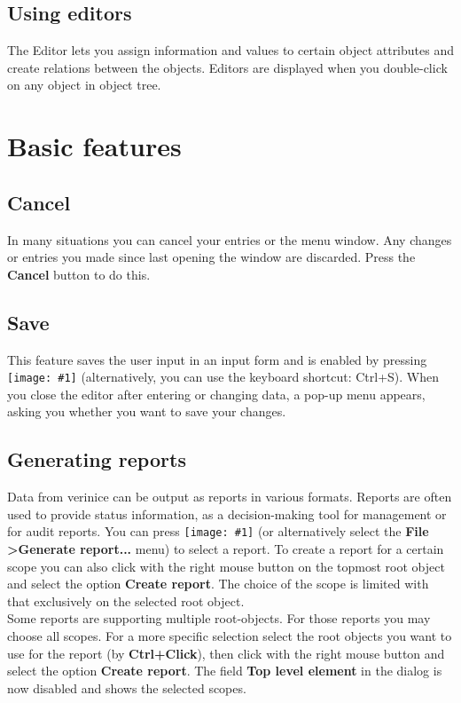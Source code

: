 \documentclass[a4paper,10pt]{book}
\newcommand{\icon}[1]{\texttt{[image: \#1]}}
\begin{document}
\section{Using editors}

The Editor lets you assign information and values to certain object attributes and create relations between the objects.
Editors are displayed when you double-click on any object in object tree.


\chapter{Basic features}
\section{Cancel}
In many situations you can cancel your entries or the menu window. Any changes or entries you made since last opening
the window are discarded. Press the \textbf{Cancel} button to do this.

\section{Save}
This feature saves the user input in an input form and is enabled by pressing
\icon{Icon/Disk.png} (alternatively, you can use the keyboard shortcut: Ctrl+S).
When you close the editor after entering or changing data, a pop-up menu appears, asking you whether you
want to save your changes.

\section{Generating reports} \label{sec:generating-reports}
Data from verinice can be output as reports in various formats.
Reports are often used to provide status information, as a decision-making tool
for management or for audit reports. You can press \icon{Icon/Report.png}
(or alternatively select the \textbf{File \textgreater Generate report...} menu) to select a report.
To create a report for a certain scope you can also click with the right mouse button on the topmost root object and
select the option \textbf{Create report}. The choice of the scope is limited with that exclusively on the selected root object.\\ 
Some reports are supporting multiple root-objects. For those reports you may
choose \glqq all scopes\grqq. For a more specific selection select the root objects you want to use for the report (by \textbf{Ctrl+Click}),
then click with the right mouse button and select the option \textbf{Create report}. The field \textbf{Top level element} in the dialog is now disabled and shows the selected scopes.\\
\end{document}
